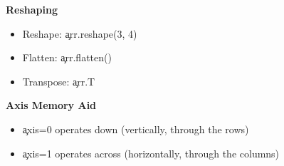 \begin{tcolorbox}[
    title=NumPy Essentials for Architects,
    colframe=gray,
    colback = white,
    arc=2mm
]
\textbf{Reshaping}
\begin{itemize}
\item Reshape: \c{arr.reshape(3, 4)}
\item Flatten: \c{arr.flatten()}
\item Transpose: \c{arr.T}
\end{itemize}

\textbf{Axis Memory Aid}
\begin{itemize}
\item \c{axis=0} operates down (vertically, through the rows)
\item \c{axis=1} operates across (horizontally, through the columns)
\end{itemize}
\end{tcolorbox}


